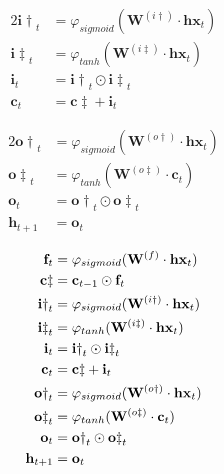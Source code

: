 \documentclass[xcolor={table}]{beamer}
\begin{document}
 \begin{frame} 
\begin{alignat}{2}
\mathbf{i\dagger}_t &= \varphi_{sigmoid}(\mathbf{W}^{(i\dagger)} \cdot \mathbf{hx}_t) \label{eqn:inputmask}\\
\mathbf{i\ddagger}_t &= \varphi_{tanh}(\mathbf{W}^{(i\ddagger)} \cdot \mathbf{hx}_t) \label{eqn:inputupdate}\\
\mathbf{i}_t & = \mathbf{i\dagger}_t \odot \mathbf{i\ddagger}_t \label{eqn:input}\\
\mathbf{c}_t & = \mathbf{c\ddagger} + \mathbf{i}_t \label{eqn:inputcellupdate}
\end{alignat}
\end{frame} 



 \begin{frame} 
\begin{alignat}{2}
\mathbf{o\dagger}_t &= \varphi_{sigmoid}(\mathbf{W}^{(o\dagger)} \cdot \mathbf{hx}_t) \label{eqn:outputmask}\\
\mathbf{o\ddagger}_t &= \varphi_{tanh}(\mathbf{W}^{(o\ddagger)} \cdot \mathbf{c}_t) \label{eqn:candidateoutput}\\
\mathbf{o}_t &= \mathbf{o\dagger}_t \odot \mathbf{o\ddagger}_t \label{eqn:outputstate}\\
\mathbf{h}_{t+1} & = \mathbf{o}_t  \label{eqn:hpropogated}
\end{alignat}
\end{frame} 



 \begin{frame} 
\begin{alignat}{2}
\mathbf{f}_t &= \varphi_{sigmoid}(\mathbf{W}^{(f)} \cdot \mathbf{hx}_t) \notag\\
\mathbf{c\ddagger} &= \mathbf{c}_{t-1} \odot \mathbf{f}_t \notag\\
\mathbf{i\dagger}_t &= \varphi_{sigmoid}(\mathbf{W}^{(i\dagger)} \cdot \mathbf{hx}_t) \notag\\
\mathbf{i\ddagger}_t &= \varphi_{tanh}(\mathbf{W}^{(i\ddagger)} \cdot \mathbf{hx}_t) \notag\\
\mathbf{i}_t & = \mathbf{i\dagger}_t \odot \mathbf{i\ddagger}_t \notag\\
\mathbf{c}_t & = \mathbf{c\ddagger} + \mathbf{i}_t\notag\\
\mathbf{o\dagger}_t &= \varphi_{sigmoid}(\mathbf{W}^{(o\dagger)} \cdot \mathbf{hx}_t)\notag\\
\mathbf{o\ddagger}_t &= \varphi_{tanh}(\mathbf{W}^{(o\ddagger)} \cdot \mathbf{c}_t) \notag\\
\mathbf{o}_t &= \mathbf{o\dagger}_t \odot \mathbf{o\ddagger}_t \notag\\
\mathbf{h}_{t+1} & = \mathbf{o}_t \notag
\end{alignat}
\end{frame} 
\end{document}
